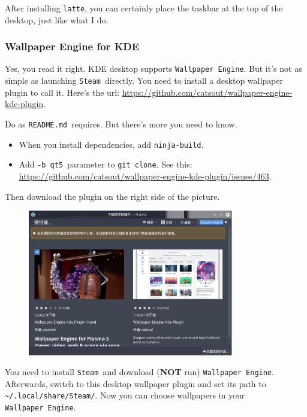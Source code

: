 \documentclass[12pt]{ctexart}
\begin{document}
After installing \texttt{latte}, you can certainly place the taskbar at
the top of the desktop, just like what I do.

\subsubsection*{\textbf{Wallpaper Engine for KDE}}

Yes, you read it right. KDE desktop supports \texttt{Wallpaper\ Engine}.
But it's not as simple as launching \texttt{Steam}\
directly. You need to install a desktop wallpaper plugin to call it.
Here's the url:
\url{https://github.com/catsout/wallpaper-engine-kde-plugin}.

Do as \texttt{README.md}\ requires. But there's more you
need to know.

\begin{itemize}
\item
  When you install dependencies, add \texttt{ninja-build}.
\item
  Add \texttt{-b\ qt5}\ parameter to \texttt{git\ clone}. See this:
  \url{https://github.com/catsout/wallpaper-engine-kde-plugin/issues/463}.
\end{itemize}

Then download the plugin on the right side of the picture.

\begin{figure}[H]
    \centering
    \includegraphics[width=0.8\textwidth,keepaspectratio]{assets/Linux/3.2 Decorate your own garden/10.png}
\end{figure}

You need to install \texttt{Steam}\ and download (\textbf{NOT} run)
\texttt{Wallpaper\ Engine}. Afterwards, switch to this desktop wallpaper
plugin and set its path to
\texttt{\textasciitilde{}/.local/share/Steam/}. Now you can choose
wallpapers in your \texttt{Wallpaper\ Engine}.
\end{document}
